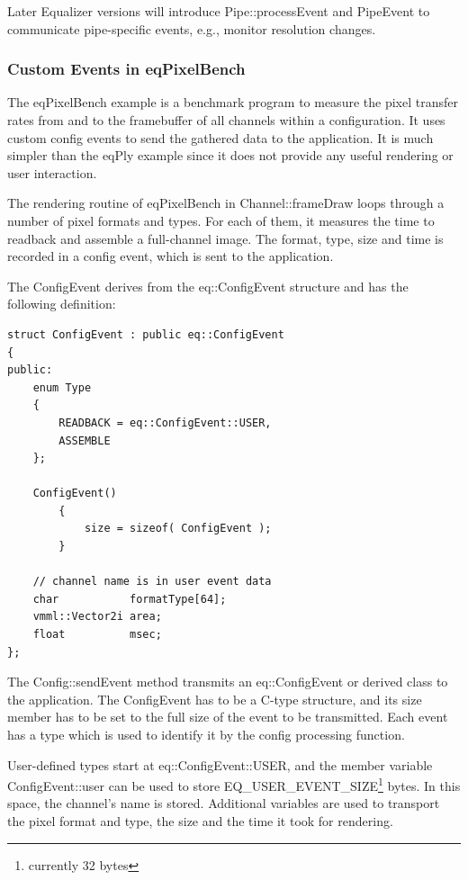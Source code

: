 \documentclass[10pt,a4]{scrartcl}
\begin{document}
Later Equalizer versions will introduce \textsf{Pipe::processEvent} and
\textsf{PipeEvent} to communicate pipe-specific events, e.g., monitor
resolution changes.

\subsubsection{Custom Events in eqPixelBench}

The \textsf{eqPixelBench} example is a benchmark program to measure the
pixel transfer rates from and to the framebuffer of all channels within
a configuration. It uses custom config events to send the gathered data
to the application. It is much simpler than the \textsf{eqPly} example
since it does not provide any useful rendering or user interaction.

The rendering routine of \textsf{eqPixelBench} in
\textsf{Channel::frameDraw} loops through a number of pixel formats and
types. For each of them, it measures the time to readback and assemble a
full-channel image. The format, type, size and time is recorded in a
config event, which is sent to the application.

The \textsf{ConfigEvent} derives from the \textsf{eq::ConfigEvent}
structure and has the following definition:

{\footnotesize\begin{lstlisting}
struct ConfigEvent : public eq::ConfigEvent
{
public:
    enum Type
    {
        READBACK = eq::ConfigEvent::USER,
        ASSEMBLE
    };

    ConfigEvent()
        {
            size = sizeof( ConfigEvent );
        }

    // channel name is in user event data
    char           formatType[64];
    vmml::Vector2i area;
    float          msec;
};
\end{lstlisting}}

The \textsf{Config::sendEvent} method transmits an
\textsf{eq::ConfigEvent} or derived class to the application. The
ConfigEvent has to be a C-type structure, and its \textsf{size}
member has to be set to the full size of the event to be transmitted.
Each event has a type which is used to identify it by the config 
processing function.

User-defined types start at \textsf{eq::ConfigEvent::USER}, and the
member variable \textsf{ConfigEvent::user} can be used to store
\textsf{EQ\_USER\_EVENT\_SIZE}\footnote{currently 32 bytes} bytes. In
this space, the channel's name is stored. Additional variables are used
to transport the pixel format and type, the size and the time it took
for rendering.
\end{document}
